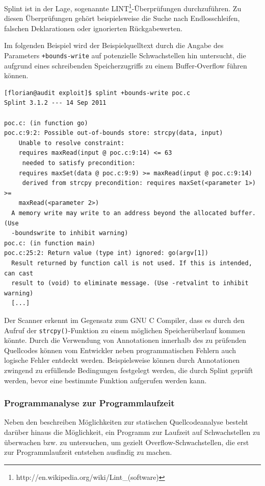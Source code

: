 Splint ist in der Lage, sogenannte LINT\footnote{http://en.wikipedia.org/wiki/Lint\_(software)}-Überprüfungen 
durchzuführen. Zu diesen Überprüfungen gehört beispielsweise die Suche 
nach Endlosschleifen, falschen Deklarationen oder ignorierten Rückgabewerten.

Im folgenden Beispiel wird der Beispielquelltext durch die Angabe des 
Parameters \texttt{+bounds-write} auf potenzielle Schwachstellen hin 
untersucht, die aufgrund eines schreibenden Speicherzugriffs zu einem 
Buffer-Overflow führen können.

\begin{lstlisting}[basicstyle=\ttfamily\footnotesize]
[florian@audit exploit]$ splint +bounds-write poc.c
Splint 3.1.2 --- 14 Sep 2011

poc.c: (in function go)
poc.c:9:2: Possible out-of-bounds store: strcpy(data, input)
    Unable to resolve constraint:
    requires maxRead(input @ poc.c:9:14) <= 63
     needed to satisfy precondition:
    requires maxSet(data @ poc.c:9:9) >= maxRead(input @ poc.c:9:14)
     derived from strcpy precondition: requires maxSet(<parameter 1>) >=
    maxRead(<parameter 2>)
  A memory write may write to an address beyond the allocated buffer. (Use
  -boundswrite to inhibit warning)
poc.c: (in function main)
poc.c:25:2: Return value (type int) ignored: go(argv[1])
  Result returned by function call is not used. If this is intended, can cast
  result to (void) to eliminate message. (Use -retvalint to inhibit warning)
  [...]
\end{lstlisting}

Der Scanner erkennt im Gegensatz zum GNU C Compiler, dass es durch den 
Aufruf der \texttt{strcpy()}-Funktion zu einem möglichen Speicherüberlauf 
kommen könnte. Durch die Verwendung von Annotationen innerhalb des zu 
prüfenden Quellcodes können vom Entwickler neben programmatischen Fehlern 
auch logische Fehler entdeckt werden. Beispielsweise können durch  
Annotationen zwingend zu erfüllende Bedingungen festgelegt werden, 
die durch Splint geprüft werden, bevor eine bestimmte Funktion aufgerufen 
werden kann.

\subsubsection{Programmanalyse zur Programmlaufzeit}

Neben den beschreiben Möglichkeiten zur statischen Quellcodeanalyse 
besteht darüber hinaus die Möglichkeit, ein Programm zur Laufzeit auf 
Schwachstellen zu überwachen bzw. zu untersuchen, um gezielt 
Overflow-Schwachstellen, die erst zur Programmlaufzeit entstehen 
ausfindig zu machen.

